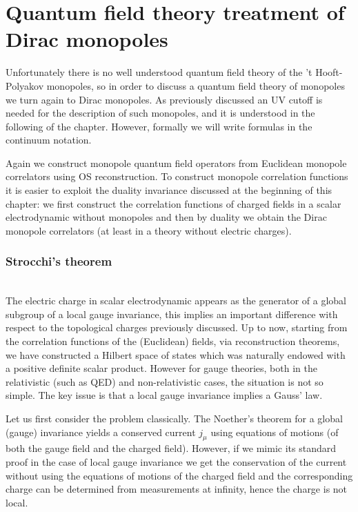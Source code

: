 \documentclass[../main/main.tex]{subfiles}
\begin{document}

\section{Quantum field theory treatment of Dirac monopoles}

Unfortunately there is no well understood quantum field theory of the 't Hooft-Polyakov monopoles, so in order to discuss a quantum field theory of monopoles we turn again to Dirac monopoles. As previously discussed an UV cutoff is needed for the description of such monopoles, and it is understood in the following of the chapter. However, formally we will write formulas in the continuum notation. 

Again we construct monopole quantum field operators from Euclidean monopole correlators using OS reconstruction. To construct monopole correlation functions it is easier to exploit the duality invariance discussed at the beginning of this chapter: we first construct the correlation functions of charged fields in a scalar electrodynamic without monopoles and then by duality we obtain the Dirac monopole correlators (at least in a theory without electric charges). 

\subsubsection{Strocchi's theorem}

\cite[Chapter 7]{Strocchi_2013}\\

The electric charge in scalar electrodynamic appears as the generator of a global subgroup of a local gauge invariance, this implies an important difference with respect to the topological charges previously discussed. 
Up to now, starting from the correlation functions of the (Euclidean) fields, via reconstruction theorems, we have constructed a Hilbert space of states which was naturally endowed with a positive definite scalar product. 
However for gauge theories, both in the relativistic (such as QED) and non-relativistic cases, the situation is not so simple. The key issue is that a local gauge invariance implies a Gauss' law. 

Let us first consider the problem classically. The Noether's theorem for a global (gauge) invariance yields a conserved current $j_\mu$ using equations of motions (of both the gauge field and the charged field). However, if we mimic its standard proof in the case of local gauge invariance we get the conservation of the current without using the equations of motions of the charged field and the corresponding charge can be determined from measurements at infinity, hence the charge is not local. 
\end{document}
